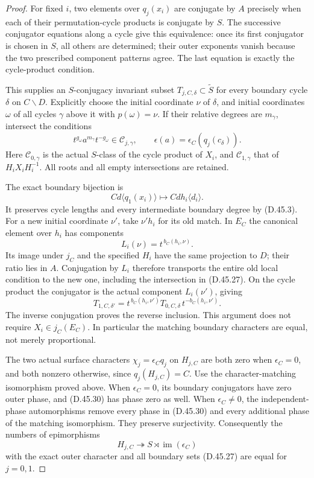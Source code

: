 \begin{proof}
For fixed \(i\), two elements over \(q_j(x_i)\)
are conjugate by \(A\) precisely when each of their
permutation-cycle products is conjugate by \(S\).
The successive conjugator equations along a cycle
give this equivalence: once its first conjugator
is chosen in \(S\), all others are determined;
their outer exponents vanish because the two
prescribed component patterns agree. The last
equation is exactly the cycle-product condition.

This supplies an \(S\)-conjugacy invariant subset
\(T_{j,C,\delta}\subset\widetilde S\) for every
boundary cycle \(\delta\) on \(C\backslash D\).
Explicitly choose the initial coordinate \(\nu\)
of \(\delta\), and initial coordinates \(\omega\)
of all cycles \(\gamma\) above it with
\(p(\omega)=\nu\).
If their relative degrees are \(m_\gamma\),
intersect the conditions
\[
        t^{g_\omega}a^{m_\gamma}t^{-g_\omega}
                   \in\mathcal C_{j,\gamma},
       \qquad
       \epsilon(a)=\epsilon_C(q_j(c_\delta)).
 \tag{D.45.27}
\]
Here \(\mathcal C_{0,\gamma}\) is the actual
\(S\)-class of the cycle product of \(X_i\), and
\(\mathcal C_{1,\gamma}\) that of
\(H_iX_iH_i^{-1}\). All roots and all empty
intersections are retained.

The exact boundary bijection is
\[
 C d\langle q_1(x_i)\rangle
       \longmapsto C d h_i\langle d_i\rangle.
 \tag{D.45.28}
\]
It preserves cycle lengths and every intermediate
boundary degree by \textup{(D.45.3)}.
For a new initial coordinate \(\nu'\), take
\(\nu'h_i\) for its old match.
In \(E_C\) the canonical element over \(h_i\)
has components
\[
                  L_i(\nu)=t^{\,b_C(h_i,\nu)}.
 \tag{D.45.29}
\]
Its image under \(j_C\) and the specified \(H_i\)
have the same projection to \(D\); their ratio
lies in \(A\). Conjugation by \(L_i\) therefore
transports the entire old local condition to the
new one, including the intersection in
\textup{(D.45.27)}.
On the cycle product the conjugator is the actual
component \(L_i(\nu')\), giving
\[
       T_{1,C,\delta'}
        =t^{\,b_C(h_i,\nu')}
              T_{0,C,\delta}\,t^{-b_C(h_i,\nu')}.
 \tag{D.45.30}
\]
The inverse conjugation proves the reverse
inclusion. This argument does not require
\(X_i\in j_C(E_C)\).
In particular the matching boundary characters
are equal, not merely proportional.

The two actual surface characters
\(\chi_j=\epsilon_Cq_j\) on \(H_{j,C}\) are both
zero when \(\epsilon_C=0\), and both nonzero
otherwise, since \(q_j(H_{j,C})=C\).
Use the character-matching isomorphism proved
above. When \(\epsilon_C=0\), its boundary
conjugators have zero outer phase, and
\textup{(D.45.30)} has phase zero as well.
When \(\epsilon_C\ne0\), the independent-phase
automorphisms remove every phase in
\textup{(D.45.30)} and every additional phase of
the matching isomorphism. They preserve
surjectivity.
Consequently the numbers of epimorphisms
\[
 H_{j,C}\twoheadrightarrow
                S\rtimes\operatorname{im}(\epsilon_C)
 \tag{D.45.31}
\]
with the exact outer character and all boundary
sets \textup{(D.45.27)} are equal for \(j=0,1\).


\end{proof}
